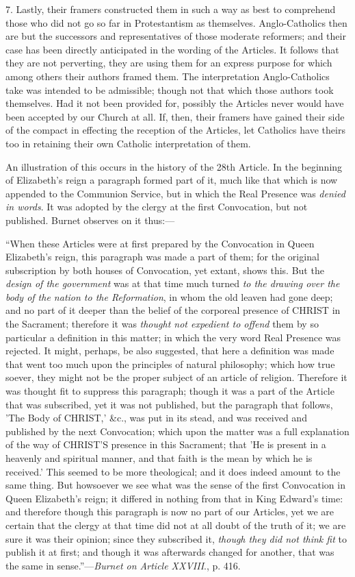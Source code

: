 7. Lastly, their framers constructed them in such a way as best to
comprehend those who did not go so far in Protestantism as themselves.
Anglo-Catholics then are but the successors and representatives of
those moderate reformers; and their case has been directly anticipated
in the wording of the Articles. It follows that they are not
perverting, they are using them for an express purpose for which among
others their authors framed them. The interpretation Anglo-Catholics
take was intended to be admissible; though not that which those
authors took themselves. Had it not been provided for, possibly the
Articles never would have been accepted by our Church at all. If,
then, their framers have gained their side of the compact in effecting
the reception of the Articles, let Catholics have theirs too in
retaining their own Catholic interpretation of them.

An illustration of this occurs in the history of the 28th Article.
In the beginning of Elizabeth's reign a paragraph formed part of it,
much like that which is now appended to the Communion Service, but in
which the Real Presence was \emph{denied in words}. It was adopted by
the clergy at the first Convocation, but not published. Burnet
observes on it thus:—

``When these Articles were at first prepared by
the Convocation in Queen Elizabeth's reign, this paragraph was made a
part of them; for the original subscription by both houses of
Convocation, yet extant, shows this. But the \emph{design of the
government} was at that time much turned \emph{to the drawing over the
body of the nation to the Reformation}, in whom the old leaven had
gone deep; and no part of it deeper than the belief of the corporeal
presence of CHRIST in the
Sacrament; therefore it was \emph{thought not expedient to offend}
them by so particular a definition in this matter; in which the very
word Real Presence was rejected. It might, perhaps, be also suggested,
that here a definition was made that went too much upon the principles
of natural philosophy; which how true soever, they might not be the
proper subject of an article of religion. Therefore it was thought fit
to suppress this paragraph; though it was a part of the Article that
was subscribed, yet it was not published, but the paragraph that
follows, 'The Body of CHRIST,'
\&c., was put in its stead, and was received and published by the
next Convocation; which upon the matter was a full explanation of the
way of CHRIST'S presence
in this Sacrament; that 'He is present in a heavenly and spiritual
manner, and that faith is the mean by which he is received.' This
seemed to be more theological; and it does indeed amount to the same
thing. But howsoever we see what was the sense of the first
Convocation in Queen Elizabeth's reign; it differed in nothing from
that in King Edward's time: and therefore though this paragraph is now
no part of our Articles, yet we are certain that the clergy at that
time did not at all doubt of the truth of it; we are sure it was their
opinion; since they subscribed it, \emph{though they did not think fit}
to publish it at first; and though it was afterwards changed for
another, that was the same in sense.''—\emph{Burnet on Article
XXVIII}., p. 416.

